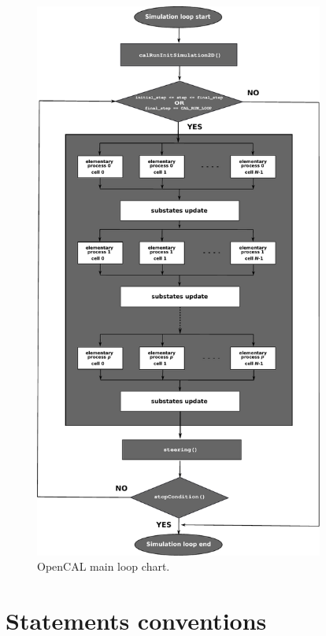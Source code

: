 \begin{figure}[htbp]
  \centering
  \includegraphics[width=9.5cm]{./images/OpenCAL/opencal_main_loop.pdf}
  \caption{OpenCAL main loop chart.}
  \label{fig:opencal_main_loop}
\end{figure}


\section{Statements conventions}\label{sec:Conventions}



